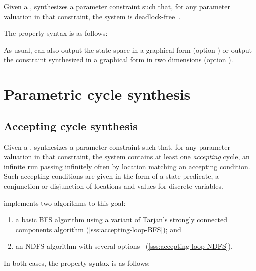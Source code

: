 Given a \NIPTA{}, \PDFC{} synthesizes a parameter constraint such that, for any parameter valuation in that constraint, the system is deadlock-free~\cite{Andre16}.

The property syntax is as follows:


As usual, \imitator{} can also
output the state space in a graphical form (option )
or
output the constraint synthesized in a graphical form in two dimensions (option ).


\section{Parametric cycle synthesis}\label{ss:mode:LoopSynth}


\subsection{Accepting cycle synthesis}\label{ss:accepting-loop}
Given a \NIPTA{}, \imitator{} synthesizes a parameter constraint such that, for any parameter valuation in that constraint, the system contains at least one \emph{accepting} cycle, \ie{} an infinite run passing infinitely often by location matching an accepting condition.
Such accepting conditions are given in the form of a state predicate, \ie{} a conjunction or disjunction of locations and values for discrete variables.

\imitator{} implements two algorithms to this goal:
\begin{enumerate}
	\item a basic BFS algorithm using a variant of Tarjan's strongly connected components algorithm (\cref{sss:accepting-loop-BFS}); and
	\item an NDFS algorithm with several options~\cite{NPP18} (\cref{sss:accepting-loop-NDFS}).
\end{enumerate}

In both cases, the property syntax is as follows:


